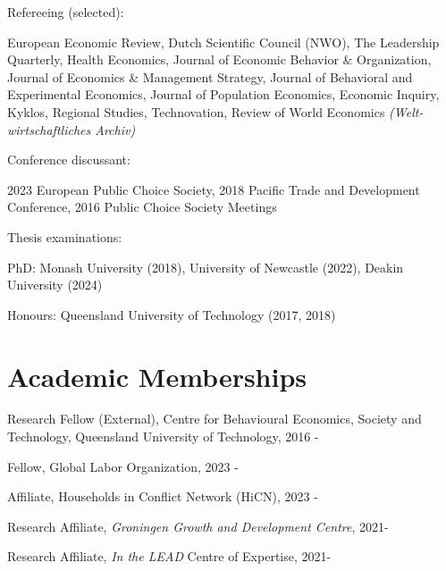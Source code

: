 \documentclass[letterpaper]{article}
\renewenvironment{itemize}{
  \begin{list}{}{
    \setlength{\leftmargin}{1.5em}
  }
}{
  \end{list}
}
\begin{document}
\begin{itemize}
\item Refereeing (selected):
\begin{itemize}
\item European Economic Review, Dutch Scientific Council (NWO), The Leadership Quarterly, Health Economics, Journal of Economic Behavior \& Organization, Journal of Economics \& Management Strategy, Journal of Behavioral and Experimental Economics, Journal of Population Economics, Economic Inquiry, Kyklos, Regional Studies, Technovation, Review of World Economics \textit{(Welt-wirtschaftliches Archiv)}
\end{itemize}

\item Conference discussant:
\begin{itemize}
\item 2023 European Public Choice Society, 2018 Pacific Trade and Development Conference, 2016 Public Choice Society Meetings
\end{itemize}

\item Thesis examinations:
\begin{itemize}
\item PhD: Monash University (2018), University of Newcastle (2022), Deakin University (2024)
\item Honours: Queensland University of Technology (2017, 2018)
\end{itemize}

\end{itemize}



\section*{Academic Memberships}

\begin{itemize}
\item Research Fellow (External), Centre for Behavioural Economics, Society and Technology, Queensland University of Technology, 2016 -
\item Fellow, Global Labor Organization, 2023 -
\item Affiliate, Households in Conflict Network (HiCN), 2023 -
\item Research Affiliate, \textit{Groningen Growth and Development Centre}, 2021-
\item Research Affiliate, \textit{In the LEAD} Centre of Expertise, 2021-
\end{itemize}
\end{document}

